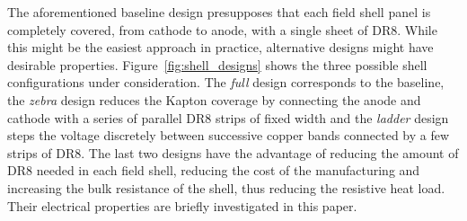 \documentclass[a4paper,12pt]{article}
\newcommand{\DR}{DR8}
\begin{document}
The aforementioned baseline design presupposes that each field shell panel is completely covered, from cathode to anode, with a single sheet of {\DR}. While this might be the easiest approach in practice, alternative designs might have desirable properties. Figure~\ref{fig:shell_designs} shows the three possible shell configurations under consideration. The \textit{full} design corresponds to the baseline, the \textit{zebra} design reduces the Kapton coverage by connecting the anode and cathode with a series of parallel {\DR} strips of fixed width and the \textit{ladder} design steps the voltage discretely between successive copper bands connected by a few strips of {\DR}. The last two designs have the advantage of reducing the amount of {\DR} needed in each field shell, reducing the cost of the manufacturing and increasing the bulk resistance of the shell, thus reducing the resistive heat load. Their electrical properties are briefly investigated in this paper.

\end{document}
